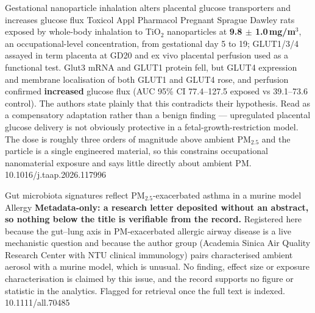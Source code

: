 \documentclass[10pt]{article}
\begin{document}
{Gestational nanoparticle inhalation alters placental glucose transporters and increases glucose flux}
{Toxicol Appl Pharmacol}
{Pregnant Sprague Dawley rats exposed by whole-body inhalation to TiO$_2$ nanoparticles at
\textbf{9.8 $\pm$ 1.0\,mg/m$^3$}, an occupational-level concentration, from gestational day
5 to 19; GLUT1/3/4 assayed in term placenta at GD20 and ex vivo placental perfusion used as
a functional test. Glut3 mRNA and GLUT1 protein fell, but GLUT4 expression and membrane
localisation of both GLUT1 and GLUT4 rose, and perfusion confirmed \textbf{increased}
glucose flux (AUC 95\% CI 77.4--127.5 exposed vs 39.1--73.6 control). The authors state
plainly that this contradicts their hypothesis. Read as a compensatory adaptation rather
than a benign finding --- upregulated placental glucose delivery is not obviously protective
in a fetal-growth-restriction model. The dose is roughly three orders of magnitude above
ambient PM$_{2.5}$ and the particle is a single engineered material, so this constrains
occupational nanomaterial exposure and says little directly about ambient PM.}
{10.1016/j.taap.2026.117996}

{Gut microbiota signatures reflect PM$_{2.5}$-exacerbated asthma in a murine model}
{Allergy}
{\textbf{Metadata-only: a research letter deposited without an abstract, so nothing below the
title is verifiable from the record.} Registered here because the gut--lung axis in
PM-exacerbated allergic airway disease is a live mechanistic question and because the author
group (Academia Sinica Air Quality Research Center with NTU clinical immunology) pairs
characterised ambient aerosol with a murine model, which is unusual. No finding, effect size
or exposure characterisation is claimed by this issue, and the record supports no figure or
statistic in the analytics. Flagged for retrieval once the full text is indexed.}
{10.1111/all.70485}

\end{document}
